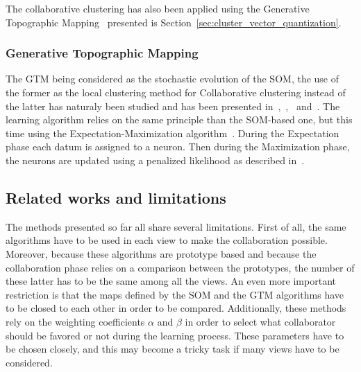     The collaborative clustering has also been applied using the Generative Topographic Mapping~\cite{bishop1998gtm} presented is Section~\ref{sec:cluster_vector_quantization}.

    \subsubsection{Generative Topographic Mapping}

    The GTM being considered as the stochastic evolution of the SOM, the use of the former as the local clustering method for Collaborative clustering instead of the latter has naturaly been studied and has been presented in~\cite{ghassany2012collaborative},~\cite{sublime2015vertical},~\cite{sublime2015horizontal} and~\cite{sublime2016collaborative}. The learning algorithm relies on the same principle than the SOM-based one, but this time using the Expectation-Maximization algorithm~\cite{dempster1977maximum}. During the Expectation phase each datum is assigned to a neuron. Then during the Maximization phase, the neurons are updated using a penalized likelihood as described in~\cite{green1990use}.\\

    \subsection{Related works and limitations}
\label{sec:survey_limitations}

    The methods presented so far all share several limitations. First of all, the same algorithms have to be used in each view to make the collaboration possible. Moreover, because these algorithms are prototype based and because the collaboration phase relies on a comparison between the prototypes, the number of these latter has to be the same among all the views. An even more important restriction is that the maps defined by the SOM and the GTM algorithms have to be closed to each other in order to be compared. Additionally, these methods rely on the weighting coefficients $\alpha$ and $\beta$ in order to select what collaborator should be favored or not during the learning process. These parameters have to be chosen closely, and this may become a tricky task if many views have to be considered.

